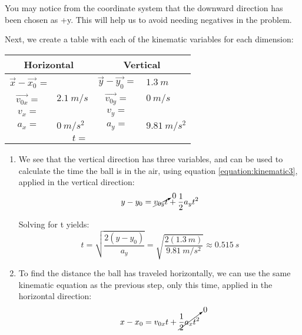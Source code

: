 {\begin{mdframed}[backgroundcolor=blue!10!white]
\begin{tikzpicture}
		
		
		
	\end{tikzpicture}
	
	You may notice from the coordinate system that the downward direction has been chosen as +y.  This will help us to avoid needing negatives in the problem.
	
	Next, we create a table with each of the kinematic variables for each dimension:
	
	\begin{longtable}{|c l | c l|}
		\hline
		\multicolumn{2}{|c|}{\textbf{Horizontal}} & \multicolumn{2}{|c|}{\textbf{ Vertical}} \\
		\hline
		$\vec{x}-\vec{x_0}$ =&     & $\vec{y}-\vec{y_0} = $ & $\SI{1.3}{m}$ \\
		\hline
		$\vec{v_{0x}} = $ & $\SI{2.1}{m/s}$ & $\vec{v_{0y}} = $ & $\SI{0}{m/s}$ \\
		\hline
		$v_x = $&  & $v_y = $ &  \\
		\hline
		$a_x = $ & $\SI{0}{m/s^2}$ & $a_y = $ & $\SI{9.81}{m/s^2}$ \\ 
		\hline
		\multicolumn{2}{|r}{$t = $} & \multicolumn{2}{l|}{  }  \\
		\hline
	\end{longtable}
	
	\begin{enumerate}
		\item We see that the vertical direction has three variables, and can be used to calculate the time the ball is in the air, using equation \cref{equation:kinematic3}, applied in the vertical direction: 
		\begin{equation*}
			y - y_0 = \cancelto{0}{v_{0y}t} + \frac{1}{2}a_yt^2
		\end{equation*}

	Solving for t yields:
		\begin{equation*}
		t = \sqrt{\frac{2(y-y_0)}{a_y}} = \sqrt{\frac{2(\SI{1.3}{m})}{\SI{9.81}{m/s^2}}} \approx \SI{0.515}{s}
	\end{equation*}

	\item To find the distance the ball has traveled horizontally, we can use the same kinematic equation as the previous step, only this time, applied in the horizontal direction:
	\begin{equation*}
	x - x_0 = v_{0x}t + \cancelto{0}{\frac{1}{2}a_xt^2}
\end{equation*}


\end{enumerate}
\end{mdframed}}
